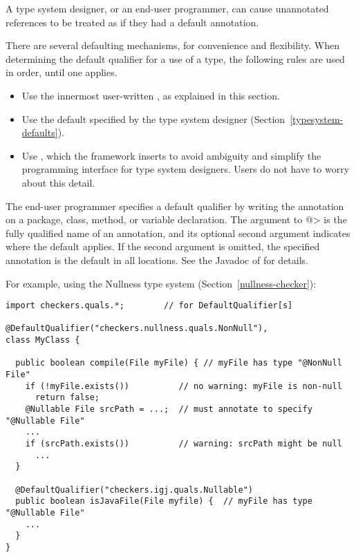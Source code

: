 A type system designer, or an end-user programmer, can cause unannotated
references to be treated as if they had a default annotation.

There are several defaulting mechanisms, for convenience and flexibility.
When determining the default qualifier for a use of a type, the following
rules are used in order, until one applies.
\begin{itemize}
\item
  Use the innermost user-written , as explained in
  this section.
\item
  Use the default specified by the type system designer
  (Section~\ref{typesystem-defaults}).
\item
  Use , which the framework
  inserts to avoid ambiguity and simplify the programming interface for
  type system designers.  Users do not have to worry about this detail.
\end{itemize}



The end-user programmer specifies a default qualifier by writing the 
annotation on a package, class, method, or variable declaration.  The
argument to \<@> is the fully qualified  name of an
annotation, and its optional second argument indicates where the default
applies.  If the second argument is omitted, the specified annotation is
the default in all locations.  See the Javadoc of  for details.

For example, using the Nullness type system (Section~\ref{nullness-checker}):

\begin{Verbatim}
import checkers.quals.*;        // for DefaultQualifier[s]

@DefaultQualifier("checkers.nullness.quals.NonNull"),
class MyClass {

  public boolean compile(File myFile) { // myFile has type "@NonNull File"
    if (!myFile.exists())          // no warning: myFile is non-null
      return false;
    @Nullable File srcPath = ...;  // must annotate to specify "@Nullable File"
    ...
    if (srcPath.exists())          // warning: srcPath might be null
      ...
  }

  @DefaultQualifier("checkers.igj.quals.Nullable")
  public boolean isJavaFile(File myfile) {  // myFile has type "@Nullable File"
    ...
  }
}
\end{Verbatim}

